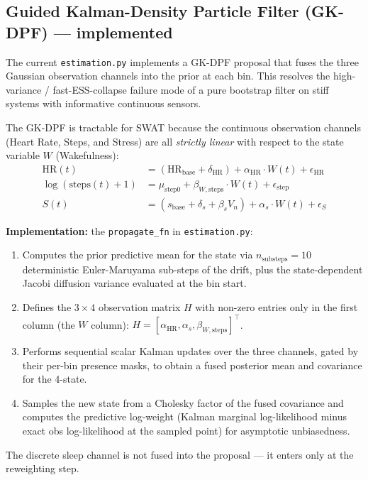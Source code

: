 \documentclass[11pt,a4paper]{article}
\begin{document}
\subsection{Guided Kalman-Density Particle Filter (GK-DPF) --- implemented}\label{sec:gkdpf-design}
The current \texttt{estimation.py} implements a GK-DPF proposal that fuses the three Gaussian observation channels into the prior at each bin. This resolves the high-variance / fast-ESS-collapse failure mode of a pure bootstrap filter on stiff systems with informative continuous sensors.

The GK-DPF is tractable for SWAT because the continuous observation channels (Heart Rate, Steps, and Stress) are all \textit{strictly linear} with respect to the state variable $W$ (Wakefulness):
\begin{align*}
\text{HR}(t) &= (\text{HR}_{\text{base}} + \delta_{\text{HR}}) + \alpha_{\text{HR}} \cdot W(t) + \epsilon_{\text{HR}} \\
\log(\text{steps}(t) + 1) &= \mu_{\text{step}0} + \beta_{W,\text{steps}} \cdot W(t) + \epsilon_{\text{step}} \\
S(t) &= (s_{\text{base}} + \delta_s + \beta_s V_n) + \alpha_s \cdot W(t) + \epsilon_S
\end{align*}

\textbf{Implementation:} the \texttt{propagate\_fn} in \texttt{estimation.py}:
\begin{enumerate}
    \item Computes the prior predictive mean for the state via $n_{\text{substeps}} = 10$ deterministic Euler-Maruyama sub-steps of the drift, plus the state-dependent Jacobi diffusion variance evaluated at the bin start.
    \item Defines the $3 \times 4$ observation matrix $H$ with non-zero entries only in the first column (the $W$ column): $H = [\alpha_{\text{HR}}, \alpha_s, \beta_{W,\text{steps}}]^\top$.
    \item Performs sequential scalar Kalman updates over the three channels, gated by their per-bin presence masks, to obtain a fused posterior mean and covariance for the 4-state.
    \item Samples the new state from a Cholesky factor of the fused covariance and computes the predictive log-weight (Kalman marginal log-likelihood minus exact obs log-likelihood at the sampled point) for asymptotic unbiasedness.
\end{enumerate}
The discrete sleep channel is not fused into the proposal --- it enters only at the reweighting step.
\end{document}
